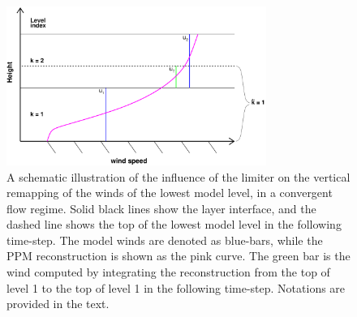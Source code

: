 \begin{figure}[h]
\centering
\includegraphics[width=20pc]{figs/schematic.pdf}
\caption{A schematic illustration of the influence of the limiter on the vertical remapping of the winds of the lowest model level, in a convergent flow regime. Solid black lines show the layer interface, and the dashed line shows the top of the lowest model level in the following time-step. The model winds are denoted as blue-bars, while the PPM reconstruction is shown as the pink curve. The green bar is the wind computed by integrating the reconstruction from the top of level 1 to the top of level 1 in the following time-step. Notations are provided in the text.}
\label{fig:schematic}
\end{figure}

